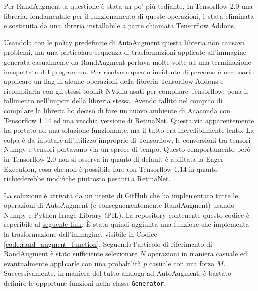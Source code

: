 Per RandAugment la questione è stata un po' più tediante. In Tensorflow 2.0 una libreria, fondamentale per il funzionamento di queste operazioni, è stata eliminata e sostituita da una \href{https://github.com/tensorflow/addons}{libreria installabile a parte chiamata Tensorflow Addons}.

Usandola con le policy predefinite di AutoAugment questa libreria non causava problemi, ma una particolare sequenza di trasformazioni applicate all'immagine generata casualmente da RandAugment portava molte volte ad una terminazione inaspettata del programma. Per risolvere questo incidente di percorso è necessario applicare un flag in alcune operazioni della libreria Tensorflow Addons e ricompilarla con gli stessi toolkit NVidia usati per compilare Tensorflow, pena il fallimento nell'import della libreria stessa. Avendo fallito nel compito di compilare la libreria ho deciso di fare un nuovo ambiente di Anaconda con Tensorflow 1.14 ed una vecchia versione di RetinaNet. 
Questa via apparentemente ha portato ad una soluzione funzionante, ma il tutto era incredibilmente lento. La colpa è da inputare all'utilizzo improprio di Tensorflow, le conversioni tra tensori Numpy e tensori portavano via un spreco di tempo. Questo comportamento però in Tensorflow 2.0 non si osserva in quanto di default è abilitata la Eager Execution, cosa che non è possibile fare con Tensorflow 1.14 in quanto richiederebbe modifiche piuttosto pesanti a RetinaNet.  

La soluzione è arrivata da un utente di GitHub che ha implementato tutte le operazioni di AutoAugment (e conseguementemente RandAugment) usando Numpy e Python Image Library (PIL). La repository contenente questo codice è reperibile al  \href{https://github.com/poodarchu/learn_aug_for_object_detection.numpy}{seguente link}.
È stata quindi aggiunta una funzione che implementa la trasformazione dell'immagine, visibile in Codice \ref{code:rand_augment_function}. Seguendo l'articolo di riferimento di RandAugment è stato sufficiente selezionare $N$ operazioni in maniera casuale ed evantualmente applicarle con una probabilità $p$ casuale con una forza $M$.
Successivamente, in maniera del tutto analoga ad AutoAugment, è bastato definire le opportune funzioni nella classe \texttt{Generator}. 

